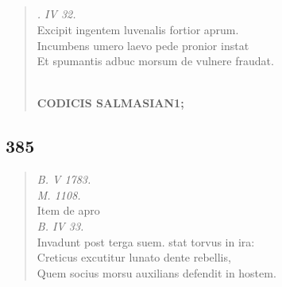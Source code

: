 \documentclass[11pt, a4paper]{report}
\begin{document}
            \subsection*{}
      \begin{verse}
      \textit{. IV 32.} \\ Excipit ingentem luvenalis fortior aprum. \\ Incumbens umero laevo pede pronior instat \\ Et spumantis adbuc morsum de vulnere fraudat. \\ 
        ﻿\pagebreak 
     \marginpar{[295]} \begin{center} \textbf{CODICIS SALMASIAN1;} \end{center}
      \end{verse}
  
            \subsection*{385}
      \begin{verse}
      \textit{B. V 1783.} \\ \textit{M. 1108.} \\ Item de apro \\ \textit{B. IV 33.} \\ Invadunt post terga suem. stat torvus in ira: \\ Creticus excutitur lunato dente rebellis, \\ Quem socius morsu auxilians defendit in hostem. \\ 
      \end{verse}
  
\end{document}
